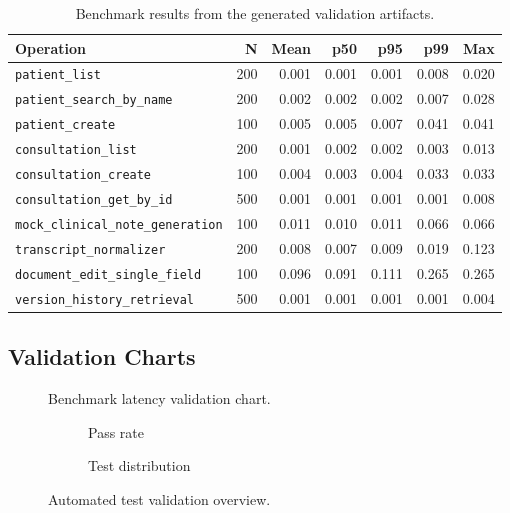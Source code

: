 \begin{longtable}{@{}L{0.35\textwidth}rrrrrr@{}}
\caption{Benchmark results from the generated validation artifacts.}\\
\toprule
\textbf{Operation} & \textbf{N} & \textbf{Mean} & \textbf{p50} & \textbf{p95} & \textbf{p99} & \textbf{Max} \\
\midrule
\texttt{patient\_list} & 200 & 0.001 & 0.001 & 0.001 & 0.008 & 0.020 \\
\texttt{patient\_search\_by\_name} & 200 & 0.002 & 0.002 & 0.002 & 0.007 & 0.028 \\
\texttt{patient\_create} & 100 & 0.005 & 0.005 & 0.007 & 0.041 & 0.041 \\
\texttt{consultation\_list} & 200 & 0.001 & 0.002 & 0.002 & 0.003 & 0.013 \\
\texttt{consultation\_create} & 100 & 0.004 & 0.003 & 0.004 & 0.033 & 0.033 \\
\texttt{consultation\_get\_by\_id} & 500 & 0.001 & 0.001 & 0.001 & 0.001 & 0.008 \\
\texttt{mock\_clinical\_note\_generation} & 100 & 0.011 & 0.010 & 0.011 & 0.066 & 0.066 \\
\texttt{transcript\_normalizer} & 200 & 0.008 & 0.007 & 0.009 & 0.019 & 0.123 \\
\texttt{document\_edit\_single\_field} & 100 & 0.096 & 0.091 & 0.111 & 0.265 & 0.265 \\
\texttt{version\_history\_retrieval} & 500 & 0.001 & 0.001 & 0.001 & 0.001 & 0.004 \\
\bottomrule
\end{longtable}

\subsection{Validation Charts}

\begin{figure}[h]
\centering
{}
\caption{Benchmark latency validation chart.}
\end{figure}

\begin{figure}[h]
\centering
\begin{subfigure}{0.48\textwidth}
  \centering
  \caption{Pass rate}
\end{subfigure}\hfill
\begin{subfigure}{0.48\textwidth}
  \centering
  \caption{Test distribution}
\end{subfigure}
\caption{Automated test validation overview.}
\end{figure}

